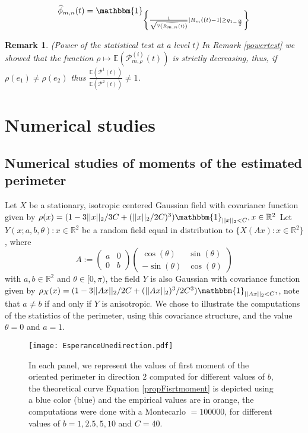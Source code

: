 \documentclass[12pt]{article}
\renewcommand{\hat}{\widehat}
\theoremstyle{Theorem}
\newtheorem{remark}{Remark}
\newcounter{Ax}
\begin{document}
\begin{equation}
\label{phihat}
\hat{\phi}_{m,n}(t)= \mathbbm{1}_{\left\{ \frac{1}{\sqrt{\hat{\mathbb{V}\left(R_{m, n}(t)\right)}}}\left|R_{m}((t) - 1 \right| \geq q_{1- \frac{\alpha}{2}} \right\}}
\end{equation}
\begin{remark}(Power of the statistical test at a level $t$) In Remark \ref{powertest} we showed that the function $\rho \mapsto \mathbb{E}\left(\mathcal{P}^{\scriptscriptstyle (i)}_{m, \rho}(t)\right)$ is strictly decreasing, thus, if $\rho(e_1) \neq \rho(e_2)$ thus $\frac{\mathbb{E}\left(\mathcal{P}^{1}(t)\right)}{\mathbb{E}\left(\mathcal{P}^{2}(t)\right)} \neq 1$. 
\end{remark}
\section{Numerical studies}
\subsection{Numerical studies of moments of the estimated perimeter}
Let $X$ be a stationary, isotropic centered Gaussian field with covariance function given by $\rho(x) = (1 -3||x||_{2}/3C + (||x||_{2}/2C)^{3})\mathbbm{1}_{||x||_{2} < C}, x \in \mathbb{R}^2$
Let ${Y(x; a, b, \theta): x \in \mathbb{R}^{2}}$ be a random field equal in distribution to  $\{X(Ax): x\in \mathbb{R}^{2}\}$, where 
\begin{equation}
A:= \begin{pmatrix} a & 0 \\ 0 & b\end{pmatrix} \begin{pmatrix} \cos(\theta) & \sin(\theta) \\ -\sin(\theta) & \cos(\theta)\end{pmatrix} 
\end{equation}
with $a, b \in \mathbb{R}^{2}$ and $\theta \in [0, \pi)$, the field $Y$ is also Gaussian with covariance function given by  $\rho_{X}(x) = (1 - 3||Ax||_{2}/2C + (||Ax||_{2})^{3}/2C^{3})\mathbbm{1}_{||Ax||_{2} < C},$, note that $a\neq b$ if and only if $Y$ is anisotropic. We chose to illustrate the computations of the statistics of the perimeter, using this covariance structure, and the value $\theta = 0$ and $a = 1$. 
\begin{figure}[H]
  \centering
    {\texttt{[image: EsperanceUnedirection.pdf]}}
    \hspace{0.2cm}
 \caption{In each panel, we represent the values of first moment of the oriented perimeter in direction $2$ computed for different values of $b$, the theoretical curve Equation \eqref{propFisrtmoment} is depicted using a blue color (blue) and the empirical values are in orange, the computations were done with a Montecarlo $= 100000$, for different values of $b = 1, 2.5, 5, 10$ and $C = 40$. }
\label{fig2}
\end{figure}
\end{document}
